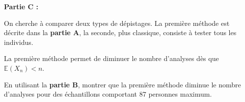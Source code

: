 \smallskip

\textbf{Partie C :}

\medskip

On cherche à comparer deux types de dépistages. La première méthode est décrite dans la \textbf{partie A}, la seconde, plus classique, consiste à tester tous les individus.

La première méthode permet de diminuer le nombre d’analyses dès que $\mathbb{E}\left(X_n\right) < n$.

\smallskip

En utilisant la \textbf{partie B}, montrer que la première méthode diminue le nombre d’analyses pour des échantillons comportant 87 personnes maximum.

